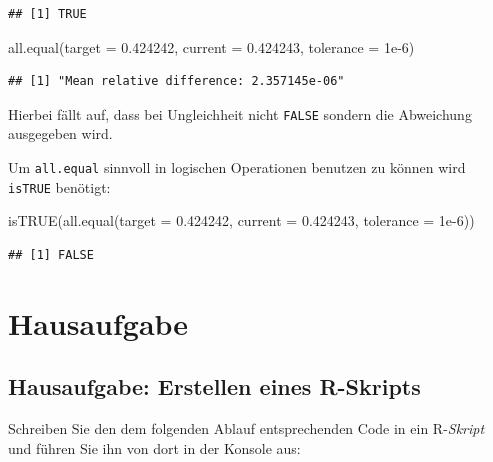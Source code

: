 \documentclass[
]{book}
\newenvironment{Shaded}{\begin{snugshade}}{\end{snugshade}}
\newcommand{\AttributeTok}[1]{\textcolor[rgb]{0.77,0.63,0.00}{#1}}
\newcommand{\FloatTok}[1]{\textcolor[rgb]{0.00,0.00,0.81}{#1}}
\newcommand{\FunctionTok}[1]{\textcolor[rgb]{0.00,0.00,0.00}{#1}}
\newcommand{\NormalTok}[1]{#1}
\begin{document}
\begin{verbatim}
## [1] TRUE
\end{verbatim}

\begin{Shaded}
\begin{Highlighting}[]
\FunctionTok{all.equal}\NormalTok{(}\AttributeTok{target =} \FloatTok{0.424242}\NormalTok{, }\AttributeTok{current =} \FloatTok{0.424243}\NormalTok{,}
          \AttributeTok{tolerance =} \FloatTok{1e{-}6}\NormalTok{)}
\end{Highlighting}
\end{Shaded}

\begin{verbatim}
## [1] "Mean relative difference: 2.357145e-06"
\end{verbatim}

Hierbei fällt auf, dass bei Ungleichheit nicht \texttt{FALSE} sondern die Abweichung ausgegeben wird.

Um \texttt{all.equal} sinnvoll in logischen Operationen benutzen zu können wird \texttt{isTRUE} benötigt:

\begin{Shaded}
\begin{Highlighting}[]
\FunctionTok{isTRUE}\NormalTok{(}\FunctionTok{all.equal}\NormalTok{(}\AttributeTok{target =} \FloatTok{0.424242}\NormalTok{,}
                 \AttributeTok{current =} \FloatTok{0.424243}\NormalTok{,}
                 \AttributeTok{tolerance =} \FloatTok{1e{-}6}\NormalTok{))}
\end{Highlighting}
\end{Shaded}

\begin{verbatim}
## [1] FALSE
\end{verbatim}

\hypertarget{hausaufgabe}{%
\section{Hausaufgabe}\label{hausaufgabe}}

\hypertarget{hausaufgabe-erstellen-eines-r-skripts}{%
\subsection*{Hausaufgabe: Erstellen eines R-Skripts}\label{hausaufgabe-erstellen-eines-r-skripts}}

Schreiben Sie den dem folgenden Ablauf entsprechenden Code in ein R-\emph{Skript} und führen Sie ihn von dort in der Konsole aus:
\end{document}
